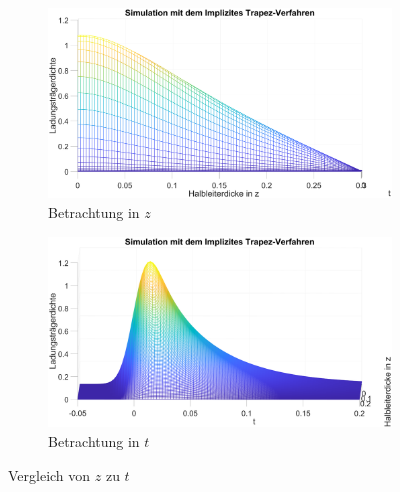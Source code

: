 \begin{figure}[h]
	
	\begin{subfigure}[b]{0.5\textwidth}
		\includegraphics[width=1\linewidth]{figures/zeitaufgeloeste/S0_dicke}
	\caption{Betrachtung in $z$}
	\label{fig:s0dicke}
	\end{subfigure}
	\hfill
	\begin{subfigure}[b]{0.5\textwidth}
		\includegraphics[width=1\linewidth]{figures/zeitaufgeloeste/S0_zeit}
		\caption{Betrachtung in $t$}
		\label{fig:s0_zeit}
	\end{subfigure}
	\caption{Vergleich von $z$ zu $t$}
\end{figure}
